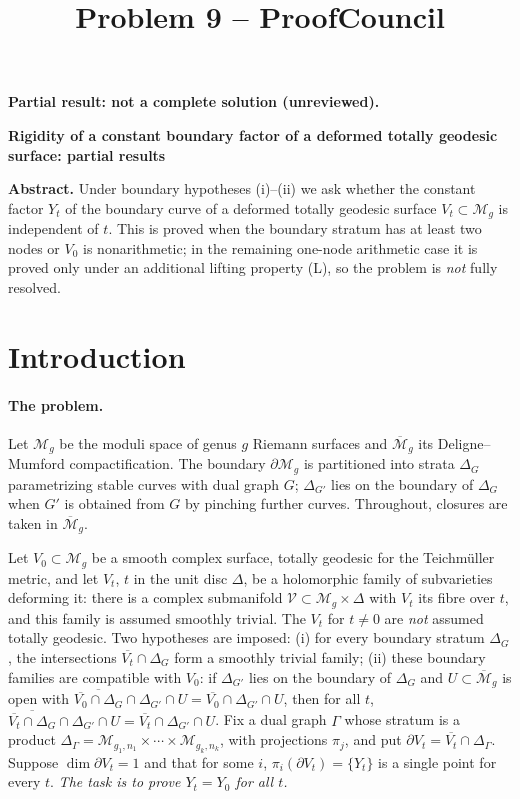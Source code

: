 \documentclass[12pt]{article}
\newcommand{\M}{\mathcal M}
\newcommand{\cl}[1]{\overline{#1}}
\theoremstyle{remark}
\begin{document}
\title{Problem 9 -- ProofCouncil}
\author{}
\date{}
\maketitle

\noindent\textbf{Partial result: not a complete solution (unreviewed).}\par

\begin{center}
\textbf{Rigidity of a constant boundary factor of a deformed
totally geodesic surface: partial results}
\end{center}

\noindent\textbf{Abstract.}
Under boundary hypotheses (i)--(ii) we ask whether the constant
factor \(Y_t\) of the boundary curve of a deformed totally geodesic
surface \(V_t\subset\M_g\) is independent of \(t\). This is proved
when the boundary stratum has at least two nodes or \(V_0\) is
nonarithmetic; in the remaining one-node arithmetic case
it is proved only under an additional lifting property (L), so the
problem is \emph{not} fully resolved.

\section{Introduction}

\paragraph{The problem.}
Let \(\M_g\) be the moduli space of genus \(g\) Riemann surfaces and
\(\cl{\M}_g\) its Deligne--Mumford compactification. The boundary
\(\partial\M_g\) is partitioned into strata \(\Delta_G\) parametrizing
stable curves with dual graph \(G\); \(\Delta_{G'}\) lies
on the boundary of \(\Delta_G\) when \(G'\) is obtained from \(G\) by
pinching further curves. Throughout, closures are taken in \(\cl{\M}_g\).

Let \(V_0\subset\M_g\) be a smooth complex surface, totally geodesic
for the Teichm\"uller metric, and let \(V_t\), \(t\) in the unit disc
\(\Delta\), be a holomorphic family of subvarieties deforming it:
there is a complex submanifold \(\mathcal V\subset\M_g\times\Delta\)
with \(V_t\) its fibre over \(t\), and this family is assumed smoothly
trivial. The \(V_t\) for \(t\ne0\) are \emph{not} assumed totally
geodesic. Two hypotheses are imposed:
(i) for every boundary stratum \(\Delta_G\), the intersections
\(\cl{V_t}\cap\Delta_G\) form a smoothly trivial family;
(ii) these boundary families are compatible with \(V_0\): if
\(\Delta_{G'}\) lies on the boundary of \(\Delta_G\) and
\(U\subset\cl{\M}_g\) is open with
\(\cl{\cl{V_0}\cap\Delta_G}\cap\Delta_{G'}\cap U
   =\cl{V_0}\cap\Delta_{G'}\cap U\),
then for all \(t\),
\(\cl{\cl{V_t}\cap\Delta_G}\cap\Delta_{G'}\cap U
   =\cl{V_t}\cap\Delta_{G'}\cap U\).
Fix a dual graph \(\Gamma\) whose stratum is a product
\(\Delta_\Gamma=\M_{g_1,n_1}\times\cdots\times\M_{g_k,n_k}\), with
projections \(\pi_j\), and put \(\partial V_t=\cl{V_t}\cap\Delta_\Gamma\).
Suppose \(\dim\partial V_t=1\) and that for some \(i\),
\(\pi_i(\partial V_t)=\{Y_t\}\) is a single point for every \(t\).
\emph{The task is to prove \(Y_t=Y_0\) for all \(t\).}
\end{document}
